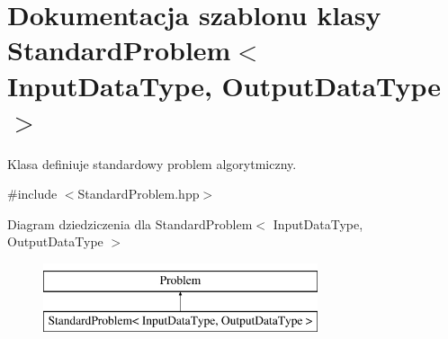 \hypertarget{class_standard_problem}{\section{Dokumentacja szablonu klasy Standard\-Problem$<$ Input\-Data\-Type, Output\-Data\-Type $>$}
\label{class_standard_problem}
}


Klasa definiuje standardowy problem algorytmiczny.  




{\ttfamily \#include $<$Standard\-Problem.\-hpp$>$}

Diagram dziedziczenia dla Standard\-Problem$<$ Input\-Data\-Type, Output\-Data\-Type $>$\begin{figure}[H]
\begin{center}
\leavevmode
\includegraphics[height=2.000000cm]{class_standard_problem}
\end{center}
\end{figure}
